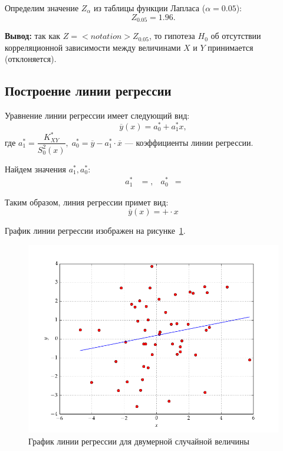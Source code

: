 \documentclass[14pt,hidelinks]{extarticle}
\begin{document}
Определим значение $ Z_\alpha $ из таблицы функции Лапласа ($ \alpha = 0.05 $):
\begin{equation*}
  Z_{0.05} = 1.96.
\end{equation*}

\textbf{Вывод:} так как $ Z =  {<}notation{>} Z_{0.05} $,
то гипотеза $H_0$ об отсутствии корреляционной зависимости между величинами $ X $ и $ Y $ принимается (отклоняется).

\newpage

\subsection{Построение линии регрессии}

Уравнение линии регрессии имеет следующий вид:
\begin{equation}
  \overline{y}(x) = a^*_0 + a^*_1 x,
\end{equation} 
где $a^*_1 = \dfrac{K^*_{XY}}{S^2_0(x)},\; a^*_0 = \overline{y} - a^*_1 \cdot \overline{x} $
--- коэффициенты линии регрессии.

\vspace{1em}
Найдем значения $ a^*_1, a^*_0 $:
\begin{equation*}
	\begin{aligned}
		a^*_1 &= , &
		a^*_0 &= 
	\end{aligned}
\end{equation*}

Таким образом, линия регрессии примет вид:
\begin{equation}
  \overline{y}(x) = 
  +  \cdot x
\end{equation}

График линии регрессии изображен на рисунке~\ref{fig:sample_regression}.
\begin{figure}[h!] 
  \centering
  \includegraphics[width=1\linewidth]{pic/sample_regression}
  \caption{График линии регрессии для двумерной случайной величины\label{fig:sample_regression}}
\end{figure}
\end{document}
